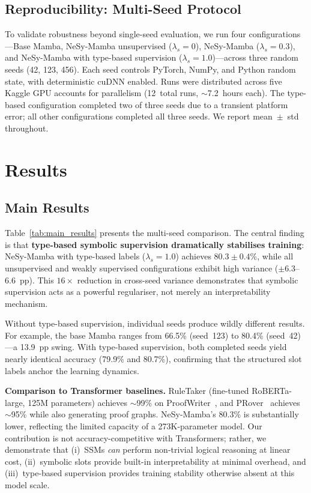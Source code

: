 \documentclass[conference]{IEEEtran}
\DeclareRobustCommand{\model}{NeSy-Mamba}
\begin{document}
\subsection{Reproducibility: Multi-Seed Protocol}
\label{sec:multiseed}

To validate robustness beyond single-seed evaluation, we run
four configurations---Base Mamba, \model{} unsupervised
($\lambda_s{=}0$), \model{} ($\lambda_s{=}0.3$), and \model{}
with type-based supervision ($\lambda_s{=}1.0$)---across three
random seeds (42, 123, 456).  Each seed controls PyTorch, NumPy,
and Python random state, with deterministic cuDNN enabled.
Runs were distributed across five Kaggle GPU accounts for
parallelism (12~total runs, {$\sim$}7.2~hours each).  The
type-based configuration completed two of three seeds due to a
transient platform error; all other configurations completed
all three seeds.  We report mean~$\pm$~std throughout.


\section{Results}
\label{sec:results}

\subsection{Main Results}

Table~\ref{tab:main_results} presents the multi-seed comparison.
The central finding is that \textbf{type-based symbolic
supervision dramatically stabilises training}: \model{} with
type-based labels ($\lambda_s{=}1.0$) achieves $80.3 \pm 0.4\%$,
while all unsupervised and weakly supervised configurations
exhibit high variance ($\pm 6.3$--$6.6$~pp).  This $16\times$
reduction in cross-seed variance demonstrates that symbolic
supervision acts as a powerful regulariser, not merely an
interpretability mechanism.

Without type-based supervision, individual seeds produce wildly
different results.  For example, the base Mamba ranges from
66.5\% (seed~123) to 80.4\% (seed~42)---a 13.9~pp swing.
With type-based supervision, both completed seeds yield
nearly identical accuracy (79.9\% and 80.7\%), confirming
that the structured slot labels anchor the learning dynamics.

\textbf{Comparison to Transformer baselines.}
RuleTaker (fine-tuned RoBERTa-large, 125M parameters) achieves
$\sim$99\% on ProofWriter~\cite{clark2020ruletaker}, and
PRover~\cite{saha2020prover} achieves $\sim$95\% while also
generating proof graphs.  \model{}'s $80.3\%$ is substantially
lower, reflecting the limited capacity of a 273K-parameter
model.  Our contribution is not accuracy-competitive with
Transformers; rather, we demonstrate that (i)~SSMs \emph{can}
perform non-trivial logical reasoning at linear cost,
(ii)~symbolic slots provide built-in interpretability at
minimal overhead, and (iii)~type-based supervision provides
training stability otherwise absent at this model scale.
\end{document}

